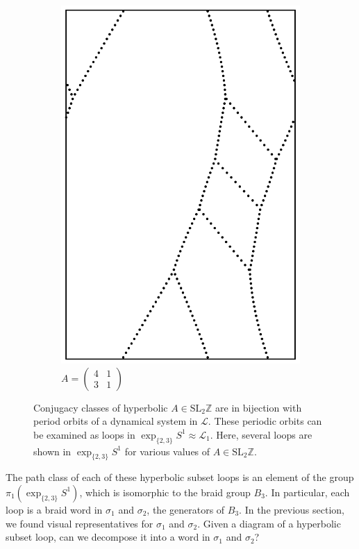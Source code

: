 \documentclass[12pt,twoside]{reedthesis}
\theoremstyle{definition}
\newcommand{\Z}{\mathbb{Z}}
\newcommand{\LS}{\mathcal{L}}
\newcommand{\SLZ}{\mathrm{SL}_2{\Z}}
\newcommand{\exptwothree}{\exp_{\{2,3\}}}
\begin{document}
\begin{figure}[h]
\begin{subfigure}[t]{0.31\textwidth}
    \includegraphics[width=\textwidth]{figures/subset_loop_pqqq_4_1_3_1.pdf}
    \caption*{$A = \begin{pmatrix}4 & 1 \\ 3 & 1\end{pmatrix}$}
  \end{subfigure}
  \caption{Conjugacy classes of hyperbolic $A \in \SLZ$ are in bijection with period orbits of a dynamical system in $\LS$. These periodic orbits can be examined as loops in $\exptwothree S^1 \approx \LS_1$. Here, several loops are shown in $\exptwothree S^1$ for various values of $A \in \SLZ$.}
  \label{fig:subset_loop_examples}
\end{figure}

The path class of each of these hyperbolic subset loops is an element of the group $\pi_1(\exptwothree S^1)$, which is isomorphic to the braid group $B_3$.
In particular, each loop is a braid word in $\sigma_1$ and $\sigma_2$, the generators of $B_3$.
In the previous section, we found visual representatives for $\sigma_1$ and $\sigma_2$.
Given a diagram of a hyperbolic subset loop, can we decompose it into a word in $\sigma_1$ and $\sigma_2$?
\end{document}
